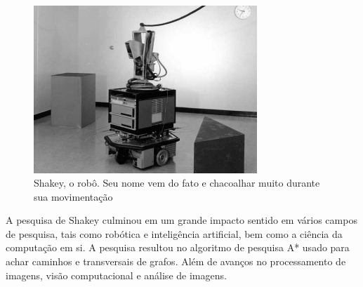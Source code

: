 \begin{figure}[H]
    \centering
    \includegraphics[width=0.75\textwidth]{figuras/shakey_robot.jpeg}
    \caption{Shakey, o robô. Seu nome vem do fato e chacoalhar muito durante sua movimentação}
    \label{fig:shakey:robo}
\end{figure}

A pesquisa de Shakey culminou em um grande impacto sentido em vários campos de pesquisa, tais como robótica e inteligência artificial, bem como a ciência da computação em si. A pesquisa resultou no algoritmo de pesquisa A* usado para achar caminhos e transversais de grafos. Além de avanços no processamento de imagens, visão computacional e análise de imagens.\cite{cassel:2017}

